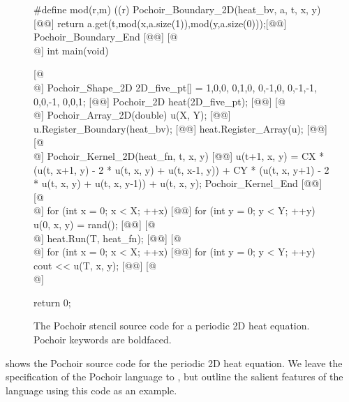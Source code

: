 \begin{figure}[t]
\begin{center-code}
\lstset{language=Pochoir_bf}
\begin{pochoir-listing}
#define mod(r,m) ((r)%
Pochoir_Boundary_2D(heat_bv, a, t, x, y) [@\label{li:heat:Boundary:begin}@]
  return a.get(t,mod(x,a.size(1)),mod(y,a.size(0)));[@\label{li:heat:returnValue}@]
Pochoir_Boundary_End [@\label{li:heat:Boundary:end}@] [@\\@]
int main(void) { [@\\@]
  Pochoir_Shape_2D 2D_five_pt[] = {{1,0,0}, {0,1,0}, {0,-1,0}, {0,-1,-1}, {0,0,-1}, {0,0,1}}; [@\label{li:heat:Shape:decl}@] 
  Pochoir_2D heat(2D_five_pt); [@\label{li:heat:Pochoir:decl}@] [@\\@]
  Pochoir_Array_2D(double) u(X, Y); [@\label{li:heat:Array:decl}@]
  u.Register_Boundary(heat_bv); [@\label{li:Array:regBdry}@] 
  heat.Register_Array(u); [@\label{li:heat:regArray}@] [@\\@]
  Pochoir_Kernel_2D(heat_fn, t, x, y) [@\label{li:heat:Kernel:begin}@]
    u(t+1, x, y) = CX * (u(t, x+1, y) - 2 * u(t, x, y) + u(t, x-1, y)) + CY * (u(t, x, y+1) - 2 * u(t, x, y) + u(t, x, y-1)) + u(t, x, y);
  Pochoir_Kernel_End [@\label{li:heat:Kernel:end}@] [@\\@]
  for (int x = 0; x < X; ++x) [@\label{li:heat:init:begin}@]
    for (int y = 0; y < Y; ++y)    
      u(0, x, y) = rand();  [@\label{li:heat:init:end}@]  [@\\@]
  heat.Run(T, heat_fn); [@\label{li:heat:run}@] [@\\@]
  for (int x = 0; x < X; ++x) [@\label{li:heat:print:begin}@]
    for (int y = 0; y < Y; ++y)    
      cout << u(T, x, y);  [@\label{li:heat:print:end}@]  [@\\@]

  return 0;
}
\end{pochoir-listing}
\end{center-code}  
\caption{The Pochoir stencil source code for a periodic 2D heat
  equation.  Pochoir keywords are boldfaced.}
\label{fig:2DHeat}
\end{figure}

 shows the Pochoir source code for the periodic 2D heat
equation.  We leave the specification of the Pochoir language to
, but outline the salient features of the language using
this code as an example.

